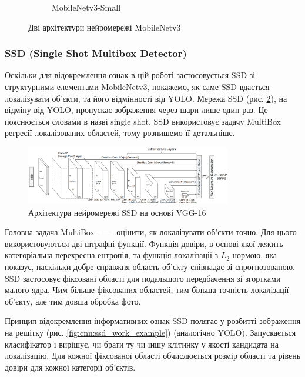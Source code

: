 \begin{figure}[H]
\begin{subfigure}[c]{0.4\textwidth}
        \caption{MobileNetv3-Small
        }
    \end{subfigure}
    \caption{Дві архітектури нейромережі MobileNetv3 \cite{bib:mobilenet:v3}
        \label{fig:cnn:mobilenetv3_architecture}
    }
\end{figure}

\subsubsection{SSD (Single Shot Multibox Detector)}

Оскільки для відокремлення ознак в цій роботі застосовується SSD зі
структурними елементами MobileNetv3, покажемо, як саме SSD вдається
локалізувати об'єкти, та його відмінності від YOLO.
Мережа SSD (рис. \ref{fig:cnn:ssd_architecture}), на відміну від YOLO, пропускає зображення
через шари лише один раз. Це пояснюється словами в назві single shot.
SSD використовує задачу MultiBox регресії локалізованих областей, тому розпишемо її детальніше.
\begin{figure}[H]
    \centering
    \includegraphics[width=0.8\textwidth]{images/cnn_ssd_architecture}
    \caption{Архітектура нейромережі SSD на основі VGG-16    \cite{bib:ssd}
        \label{fig:cnn:ssd_architecture}
    }
\end{figure}
Головна задача MultiBox ~---~ оцінити, як локалізувати об'єкти точно. Для цього використовуються
дві штрафні функції. Функція довіри, в основі якої лежить категоріальна перехресна ентропія, та
функція локалізації з $L_2$ нормою, яка показує, наскільки добре справжня область об'єкту співпадає
зі спрогнозованою.
SSD застосовує фіксовані області для подальшого передбачення
зі згортками малого ядра.
Чим більше фіксованих областей, тим більша точність локалізації об'єкту,
але тим довша обробка фото.

Принцип відокремлення інформативних ознак SSD полягає у розбитті зображення на решітку
(рис. \ref{fig:cnn:ssd_work_example}) (аналогічно YOLO). Запускається класифікатор
і вирішує, чи брати ту чи іншу клітинку у якості кандидата на локалізацію.
Для кожної фіксованої області обчислюється розмір
області та рівень довіри для кожної категорії об'єктів.

